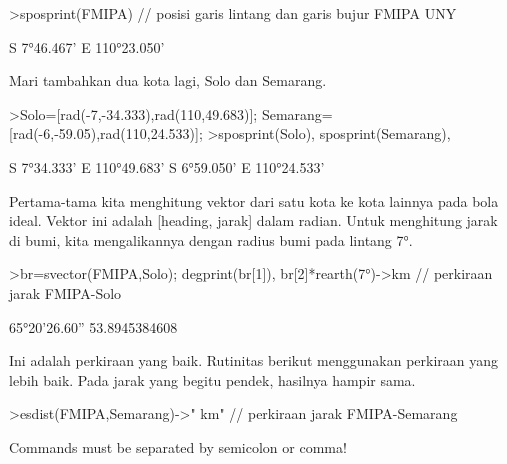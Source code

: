 \documentclass[12pt,arial,letterpaper]{book}
\begin{document}
\begin{eulercomment}
\begin{eulercomment}
\begin{eulercomment}
\begin{eulercomment}
\begin{eulercomment}
\begin{eulercomment}
\begin{eulercomment}
\begin{eulercomment}
\begin{eulercomment}
\begin{eulercomment}
\begin{eulercomment}
\begin{eulercomment}
\begin{eulercomment}
\begin{eulercomment}
\begin{eulercomment}
\begin{eulercomment}
\begin{eulercomment}
\begin{eulercomment}
\begin{eulercomment}
\begin{eulercomment}
\begin{eulercomment}
\begin{eulercomment}
\begin{eulercomment}
\begin{eulercomment}
\begin{eulercomment}
\begin{eulercomment}
\begin{eulercomment}
\begin{eulercomment}
\begin{eulercomment}
\begin{eulercomment}
\begin{eulerprompt}
>sposprint(FMIPA) // posisi garis lintang dan garis bujur FMIPA UNY
\end{eulerprompt}
\begin{euleroutput}
  S 7°46.467' E 110°23.050'
\end{euleroutput}
\begin{eulercomment}
Mari tambahkan dua kota lagi, Solo dan Semarang.
\end{eulercomment}
\begin{eulerprompt}
>Solo=[rad(-7,-34.333),rad(110,49.683)]; Semarang=[rad(-6,-59.05),rad(110,24.533)];
>sposprint(Solo), sposprint(Semarang),
\end{eulerprompt}
\begin{euleroutput}
  S 7°34.333' E 110°49.683'
  S 6°59.050' E 110°24.533'
\end{euleroutput}
\begin{eulercomment}
Pertama-tama kita menghitung vektor dari satu kota ke kota lainnya
pada bola ideal. Vektor ini adalah [heading, jarak] dalam radian.
Untuk menghitung jarak di bumi, kita mengalikannya dengan radius bumi
pada lintang 7°.
\end{eulercomment}
\begin{eulerprompt}
>br=svector(FMIPA,Solo); degprint(br[1]), br[2]*rearth(7°)->km // perkiraan jarak FMIPA-Solo
\end{eulerprompt}
\begin{euleroutput}
  65°20'26.60''
  53.8945384608
\end{euleroutput}
\begin{eulercomment}
Ini adalah perkiraan yang baik. Rutinitas berikut menggunakan
perkiraan yang lebih baik. Pada jarak yang begitu pendek, hasilnya
hampir sama.
\end{eulercomment}
\begin{eulerprompt}
>esdist(FMIPA,Semarang)->" km" // perkiraan jarak FMIPA-Semarang
\end{eulerprompt}
\begin{euleroutput}
  Commands must be separated by semicolon or comma!

\end{euleroutput}
\end{eulercomment}
\end{eulercomment}
\end{eulercomment}
\end{eulercomment}
\end{eulercomment}
\end{eulercomment}
\end{eulercomment}
\end{eulercomment}
\end{eulercomment}
\end{eulercomment}
\end{eulercomment}
\end{eulercomment}
\end{eulercomment}
\end{eulercomment}
\end{eulercomment}
\end{eulercomment}
\end{eulercomment}
\end{eulercomment}
\end{eulercomment}
\end{eulercomment}
\end{eulercomment}
\end{eulercomment}
\end{eulercomment}
\end{eulercomment}
\end{eulercomment}
\end{eulercomment}
\end{eulercomment}
\end{eulercomment}
\end{eulercomment}
\end{eulercomment}
\end{document}

